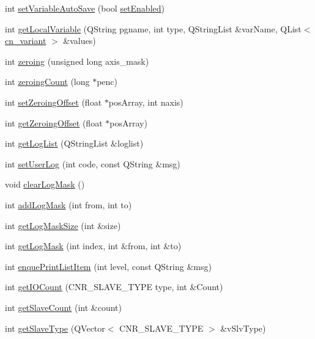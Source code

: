 \begin{DoxyCompactItemize}
\item 
int \hyperlink{classCUIApp_a3c0ac9e02ec745c05658c8ab58b8bc02}{set\-Variable\-Auto\-Save} (bool \hyperlink{classCUIApp_a0bb9aaecc950f991d3ecc69e5895e9e6}{set\-Enabled})
\item 
int \hyperlink{classCUIApp_af395e2921886ba613c3c461169b65c99}{get\-Local\-Variable} (Q\-String pgname, int type, Q\-String\-List \&var\-Name, Q\-List$<$ \hyperlink{structcn__variant}{cn\-\_\-variant} $>$ \&values)
\item 
int \hyperlink{classCUIApp_a64d3d2e86624b51e5f990ac73b85f9ec}{zeroing} (unsigned long axis\-\_\-mask)
\item 
int \hyperlink{classCUIApp_aaf099c230d05b323f5ab62c25ca040ba}{zeroing\-Count} (long $\ast$penc)
\item 
int \hyperlink{classCUIApp_a2936477854549f24236662a1967c0c78}{set\-Zeroing\-Offset} (float $\ast$pos\-Array, int naxis)
\item 
int \hyperlink{classCUIApp_ade2fe0edbcadb0d9c31e23db494033c3}{get\-Zeroing\-Offset} (float $\ast$pos\-Array)
\item 
int \hyperlink{classCUIApp_a02a5f7d94a6ca9ba0c050574e8fb9ee5}{get\-Log\-List} (Q\-String\-List \&loglist)
\item 
int \hyperlink{classCUIApp_abbe30c42f3161debd9c5b61c4afea678}{set\-User\-Log} (int code, const Q\-String \&msg)
\item 
void \hyperlink{classCUIApp_a803e0e51595b7d38ead94d1fe6cae849}{clear\-Log\-Mask} ()
\item 
int \hyperlink{classCUIApp_a29dc28296cfb8e9271cd0b77fa13789a}{add\-Log\-Mask} (int from, int to)
\item 
int \hyperlink{classCUIApp_a2590acef111dbbaa876de86ac1b323a5}{get\-Log\-Mask\-Size} (int \&size)
\item 
int \hyperlink{classCUIApp_ad4f668fddc3ba074f8006bc13b6fa445}{get\-Log\-Mask} (int index, int \&from, int \&to)
\item 
int \hyperlink{classCUIApp_a174d987f2079552ee55978771061dc9b}{enque\-Print\-List\-Item} (int level, const Q\-String \&msg)
\item 
int \hyperlink{classCUIApp_a997e16c024559902626cc6fc98c9ef6b}{get\-I\-O\-Count} (C\-N\-R\-\_\-\-S\-L\-A\-V\-E\-\_\-\-T\-Y\-P\-E type, int \&Count)
\item 
int \hyperlink{classCUIApp_a36a0dd9664cf48673640716277638e58}{get\-Slave\-Count} (int \&count)
\item 
int \hyperlink{classCUIApp_ada4c7ae52850321862eb34f6c3190af6}{get\-Slave\-Type} (Q\-Vector$<$ C\-N\-R\-\_\-\-S\-L\-A\-V\-E\-\_\-\-T\-Y\-P\-E $>$ \&v\-Slv\-Type)

\end{DoxyCompactItemize}
